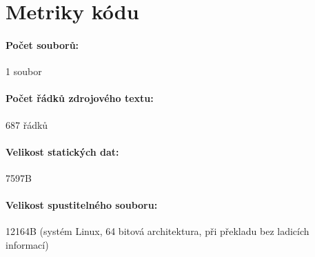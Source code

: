 \documentclass[12pt,a4paper,titlepage,final]{article}
\begin{document}
\section{Metriky kódu} \label{metriky}
\paragraph{Počet souborů:} 1 soubor
\paragraph{Počet řádků zdrojového textu:} 687 řádků
\paragraph{Velikost statických dat:} 7597B
\paragraph{Velikost spustitelného souboru:} 12164B (systém Linux, 64 bitová
architektura, při překladu bez ladicích informací)
\end{document}
